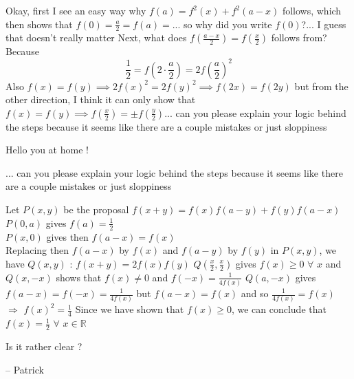 \begin{mysolution}
	Okay, first I see an easy way why $f(a)=f^{2}(x)+f^{2}(a-x)$ follows, which then shows that $f(0)=\frac{a}{2}=f(a)=...$ so why did you write $f(0)$?... I guess that doesn't really matter
Next, what does $f\left(\frac{a-x}{2}\right) = f\left(\frac{x}{2}\right)$ follows from?
Because \[\frac12=f\left(2\cdot\frac{a}{2}\right)=2f\left(\frac{a}{2}\right)^{2}\]
Also $f(x)=f(y)\implies 2f(x)^{2}=2f(y)^{2}\implies f(2x)=f(2y)$ but from the other direction, I think it can only show that $f(x)=f(y)\implies f\left(\frac{x}{2}\right)=\pm f\left(\frac{y}{2}\right)$... can you please explain your logic behind the steps because it seems like there are a couple mistakes or just sloppiness
\end{mysolution}



\begin{mysolution}
	Hello you at home !
\begin{tcolorbox}... can you please explain your logic behind the steps because it seems like there are a couple mistakes or just sloppiness\end{tcolorbox}

Let $P(x,y)$ be the proposal $f(x+y)=f(x)f(a-y)+f(y)f(a-x)$ \\
$P(0,a)$ gives $f(a)=\frac{1}{2}$ \\
$P(x,0)$ gives then $f(a-x)=f(x)$ \\
Replacing then $f(a-x)$ by $f(x)$ and $f(a-y)$ by $f(y)$ in $P(x,y)$, we have $Q(x,y)$ : $f(x+y)=2f(x)f(y)$
$Q(\frac{x}{2},\frac{x}{2})$ gives $f(x)\geq 0$ $\forall$ $x$ and $Q(x,-x)$ shows that $f(x)\neq 0$ and $f(-x)=\frac{1}{4f(x)}$
$Q(a,-x)$ gives $f(a-x)=f(-x)=\frac{1}{4f(x)}$ but $f(a-x)=f(x)$ and so $\frac{1}{4f(x)}=f(x)$ $\Rightarrow$ $f(x)^{2}=\frac{1}{4}$
Since we have shown that $f(x)\geq 0$, we can conclude that $f(x)=\frac{1}{2}$ $\forall$ $x\in \mathbb{R}$

Is it rather clear ?

-- 
Patrick
\end{mysolution}



